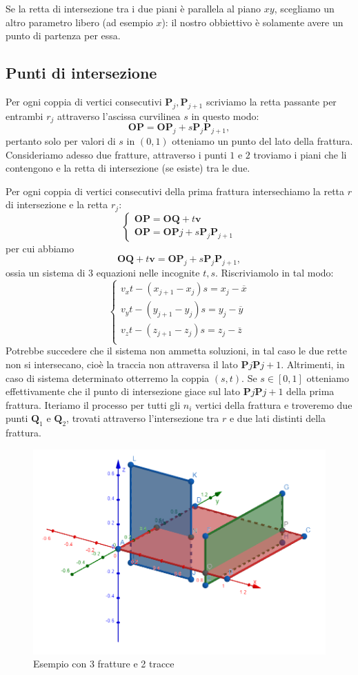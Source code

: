 \documentclass[a4paper]{article}
\newcommand{\B}{\mathbf}
\begin{document}
Se la retta di intersezione tra i due piani è parallela al piano $xy$, scegliamo un altro parametro libero (ad esempio $x$): il nostro obbiettivo è solamente avere un punto di partenza per essa.
\subsection{Punti di intersezione}
Per ogni coppia di vertici consecutivi $\B{P}_j,\B{P}_{j+1}$ scriviamo la retta passante per entrambi $r_j$ attraverso l'ascissa curvilinea $s$ in questo modo: 
$$
\B{OP}=\B{OP}_j+s\B{P}_j\B{P}_{j+1},
$$
pertanto solo per valori di $s$ in $(0,1)$ otteniamo un punto del lato della frattura. 
Consideriamo adesso due fratture, attraverso i punti $1$ e $2$ troviamo i piani che li contengono e la retta di intersezione (se esiste) tra le due.

Per ogni coppia di vertici consecutivi della prima frattura intersechiamo la retta $r$ di intersezione e la retta $r_j$:
$$
\begin{cases}
\B{OP}=\B{OQ}+t\B{v} \\ 
\B{OP}=\B{OP}j+s\B{P}_j\B{P}_{j+1}
\end{cases}
$$
per cui abbiamo $$\B{OQ}+t\B{v}=\B{OP}_j+s\B{P}_j\B{P}_{j+1},$$ ossia un sistema di $3$ equazioni nelle incognite $t,s$. Riscriviamolo in tal modo:
\begin{equation} \label{sis:parametri}
\begin{cases}
v_xt-(x_{j+1}-x_j)s=x_j-\overline{x} \\
v_yt-(y_{j+1}-y_j)s=y_j-\overline{y} \\
v_zt-(z_{j+1}-z_j)s=z_j-\overline{z} \\
\end{cases}
\end{equation}
Potrebbe succedere che il sistema non ammetta soluzioni, in tal caso le due rette non si intersecano, cioè la traccia non attraversa il lato $\B{P}j\B{P}{j+1}$. Altrimenti, in caso di sistema determinato otterremo la coppia $(s,t)$. Se $s\in[0,1]$ otteniamo effettivamente che il punto di intersezione giace sul lato $\B{P}j\B{P}{j+1}$ della prima frattura. Iteriamo il processo per tutti gli $n_i$ vertici della frattura e troveremo due punti $\B{Q}_1$ e $\B{Q}_2$, trovati attraverso l'intersezione tra $r$ e due lati distinti della frattura.

\begin{figure}
    \centering
    \includegraphics[width=0.45 \textwidth]{im2.png}
    \caption{Esempio con 3 fratture e 2 tracce}
    \label{fig:esempio}
\end{figure}
\end{document}
